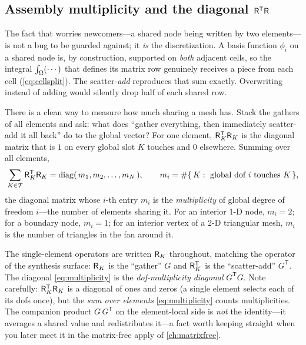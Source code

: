 \subsection{Assembly multiplicity and the diagonal \texorpdfstring{$\mathsf{R}^{\mathsf T}\mathsf{R}$}{R'R}}

The fact that worries newcomers---a shared node being written by two
elements---is not a bug to be guarded against; it \emph{is} the discretization.
A basis function $\phi_i$ on a shared node is, by construction, supported on
\emph{both} adjacent cells, so the integral $\int_\Omega(\cdots)$ that defines its
matrix row genuinely receives a piece from each cell (\cref{eq:cellsplit}). The
scatter-\emph{add} reproduces that sum exactly. Overwriting instead of adding
would silently drop half of each shared row.

There is a clean way to measure how much sharing a mesh has. Stack the gathers of
all elements and ask: what does ``gather everything, then immediately
scatter-add it all back'' do to the global vector? For one element,
$\mathsf{R}_K^{\mathsf T}\mathsf{R}_K$ is the diagonal matrix that is $1$ on every
global slot $K$ touches and $0$ elsewhere. Summing over all elements,
\begin{equation}
\sum_{K\in\mathcal{T}}\mathsf{R}_K^{\mathsf T}\mathsf{R}_K
=\operatorname{diag}(\,m_1,m_2,\dots,m_N\,),
\qquad
m_i=\#\{\,K:\text{ global dof }i\text{ touches }K\,\},
\label{eq:multiplicity}
\end{equation}
the diagonal matrix whose $i$-th entry $m_i$ is the \emph{multiplicity} of global
degree of freedom $i$---the number of elements sharing it. For an interior 1-D
node, $m_i=2$; for a boundary node, $m_i=1$; for an interior vertex of a 2-D
triangular mesh, $m_i$ is the number of triangles in the fan around it.

\begin{notationbox}
The single-element operators are written $\mathsf{R}_K$ throughout, matching the
 operator of the synthesis surface: $\mathsf{R}_K$ is the
``gather'' $G$ and $\mathsf{R}_K^{\mathsf T}$ is the ``scatter-add'' $G^{\mathsf T}$.
The diagonal \cref{eq:multiplicity} is the \emph{dof-multiplicity diagonal}
$G^{\mathsf T}G$. Note carefully: $\mathsf{R}_K^{\mathsf T}\mathsf{R}_K$ is a diagonal of
ones and zeros (a single element selects each of its dofs once), but the
\emph{sum over elements} \cref{eq:multiplicity} counts multiplicities. The
companion product $G\,G^{\mathsf T}$ on the element-local side is \emph{not} the
identity---it averages a shared value and redistributes it---a fact worth keeping
straight when you later meet it in the matrix-free apply of \cref{ch:matrixfree}.
\end{notationbox}


